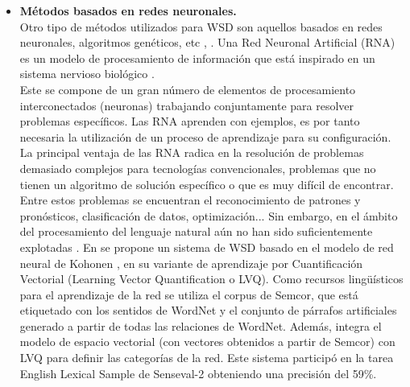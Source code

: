 \begin{itemize}
  \item \textbf{Métodos basados en redes neuronales.} \\
  Otro tipo de métodos utilizados para WSD son aquellos basados en redes neuronales, algoritmos genéticos, etc \cite{039}, \cite{040}. Una Red Neuronal Artificial (RNA) es un modelo de procesamiento de información que está inspirado en un sistema nervioso biológico \cite{041}.\\
  Este se compone de un gran número de elementos de procesamiento interconectados (neuronas) trabajando conjuntamente para resolver problemas específicos. Las RNA aprenden con ejemplos, es por tanto necesaria la utilización de un proceso de aprendizaje para su configuración. La principal ventaja de las RNA radica en la resolución de problemas demasiado complejos para tecnologías convencionales, problemas que no tienen un algoritmo de solución específico o que es muy difícil de encontrar. Entre estos problemas se encuentran el reconocimiento de patrones y pronósticos, clasificación de datos, optimización... Sin embargo, en el ámbito del procesamiento del lenguaje natural aún no han sido suficientemente explotadas \cite{042}. En \cite{043} se propone un sistema de WSD basado en el modelo de red neural de Kohonen \cite{044}, en su variante de aprendizaje por Cuantificación Vectorial (Learning Vector Quantification o LVQ). Como recursos lingüísticos para el aprendizaje de la red se utiliza el corpus de Semcor, que está etiquetado con los sentidos de WordNet y el conjunto de párrafos artificiales generado a partir de todas las relaciones de WordNet. Además, integra el modelo de espacio vectorial (con vectores obtenidos a partir de Semcor) con LVQ para definir las categorías de la red. Este sistema participó en la tarea English Lexical Sample de Senseval-2 obteniendo una precisión del 59\%.

\end{itemize}

